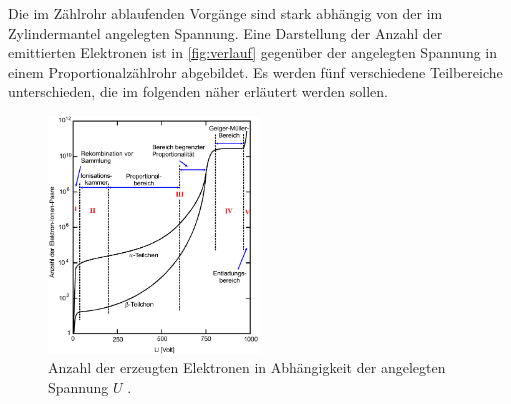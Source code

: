 Die im Zählrohr ablaufenden Vorgänge sind stark abhängig von der im Zylindermantel angelegten Spannung.
Eine Darstellung der Anzahl der emittierten Elektronen ist in \autoref{fig:verlauf} gegenüber der angelegten Spannung in einem Proportionalzählrohr abgebildet.
Es werden fünf verschiedene Teilbereiche unterschieden, die im folgenden näher erläutert werden sollen.
\begin{figure}[H]
    \centering
    \includegraphics[width=0.5\textwidth]{data/verlauf.png}
    \caption{Anzahl der erzeugten Elektronen in Abhängigkeit der angelegten Spannung $U$ \cite{Anleitung703}.}
    \label{fig:verlauf}
\end{figure}

